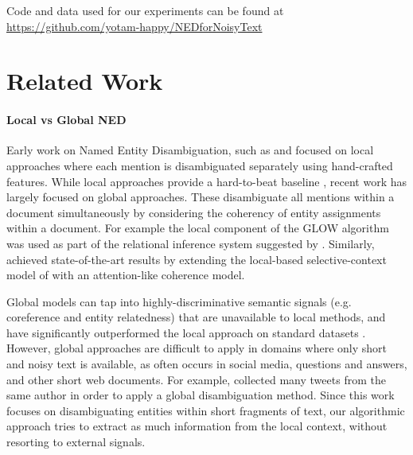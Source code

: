 \documentclass[11pt,a4paper]{article}
\begin{document}
	Code and data used for our experiments can be found at \url{https://github.com/yotam-happy/NEDforNoisyText}
	

	\section{Related Work}
	
	\paragraph{Local vs Global NED}
	
	Early work on Named Entity Disambiguation, such as  and  focused on local approaches where each mention is disambiguated separately using hand-crafted features. While local approaches provide a hard-to-beat baseline \cite{Ratinov2011}, recent work has largely focused on global approaches. These disambiguate all mentions within a document simultaneously by considering the coherency of entity assignments within a document. For example the local component of the GLOW algorithm \cite{Ratinov2011} was used as part of the relational inference system suggested by . Similarly,  achieved state-of-the-art results by extending the local-based selective-context model of  with an attention-like coherence model.
	
	Global models can tap into highly-discriminative semantic signals (e.g. coreference and entity relatedness) that are unavailable to local methods, and have significantly outperformed the local approach on standard datasets \cite{guo2014entity,pershina2015personalized,Globerson2016}.
	However, global approaches are difficult to apply in domains where only short and noisy text is available, as often occurs in social media, questions and answers, and other short web documents. For example,  collected many tweets from the same author in order to apply a global disambiguation method. Since this work focuses on disambiguating entities within short fragments of text, our algorithmic approach tries to extract as much information from the local context, without resorting to external signals.
\end{document}
